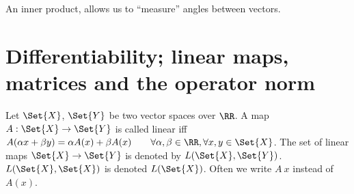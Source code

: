 \begin{rem}
 An inner product, allows us to ``measure'' angles between vectors.
\end{rem}
\section[Differentiability]{Differentiability; linear maps, matrices and the operator norm}
\begin{defn}
 Let $\Set{X}$, $\Set{Y}$ be two vector spaces over $\RR$. A map $A:\Set{X}\to\Set{Y}$ is called linear iff $A(\alpha x+\beta y)=\alpha A(x)+\beta A(x)\qquad \forall \alpha, \beta\in\RR, \forall x,y\in\Set{X}$. The set of linear maps $\Set{X}\to\Set{Y}$ is denoted by $L(\Set{X}, \Set{Y})$. $L(\Set{X},\Set{X})$ is denoted $L(\Set{X})$. Often we write $A\ x$ instead of $A(x)$. 
\end{defn}
